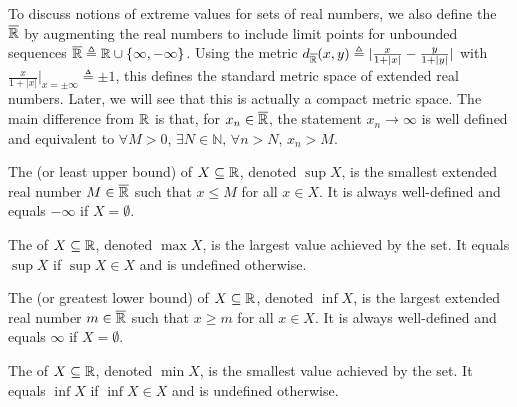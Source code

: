 To discuss notions of extreme values for sets of real numbers, we also define the  $\overline{\mathbb{R}}$ by augmenting the real numbers to include limit points for unbounded sequences $\overline{\mathbb{R}} \triangleq \mathbb{R} \cup \{ \infty,-\infty\}$.
Using the metric $d_{\overline{\mathbb{R}}} (x,y) \triangleq |\frac{x}{1+|x|} - \frac{y}{1+|y|}|$ with $\frac{x}{1+|x|}|_{x = \pm \infty} \triangleq \pm 1$, this defines the standard metric space of extended real numbers.
Later, we will see that this is actually a compact metric space.
The main difference from $\mathbb{R}$ is that, for  $x_n \in \overline{\mathbb{R}}$, the statement  $x_n \to \infty$ is well defined and equivalent to $\forall M>0, \, \exists N\in \mathbb{N}, \, \forall n>N, \, x_n > M$.
\begin{definition}
The  (or least upper bound) of $X\subseteq \mathbb{R}$, denoted $\sup X$, is the smallest extended real number $M \in \overline{\mathbb{R}}$ such that $x\leq M$ for all $x\in X$.
It is always well-defined and equals $-\infty$ if $X=\emptyset$.
\end{definition}

\begin{definition}
The  of $X\subseteq \mathbb{R}$, denoted $\max X$, is the largest value achieved by the set.
It equals $\sup X$ if $\sup X \in X$ and is undefined otherwise.
\end{definition}

\begin{definition}
The  (or greatest lower bound) of $X\subseteq \mathbb{R}$, denoted $\inf X$, is the largest extended real number $m \in \overline{\mathbb{R}}$ such that $x\geq m$ for all $x\in X$.
It is always well-defined and equals $\infty$ if $X=\emptyset$.
\end{definition}

\begin{definition}
The  of $X\subseteq \mathbb{R}$, denoted $\min X$, is the smallest value achieved by the set.
It equals $\inf X$ if $\inf X \in X$ and is undefined otherwise.
\end{definition}

